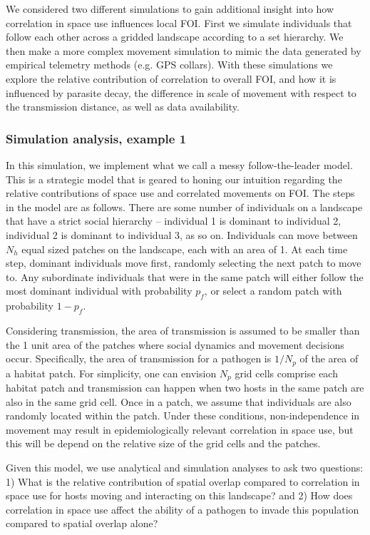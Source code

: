 \documentclass[letterpaper]{article}
\begin{document}
We considered two different simulations to gain additional insight into how correlation in space use influences local FOI. First we simulate individuals that follow each other across a gridded landscape according to a set hierarchy. We then make a more complex movement simulation to mimic the data generated by empirical telemetry methods (e.g. GPS collars). With these simulations we explore the relative contribution of correlation to overall FOI, and how it is influenced by parasite decay, the difference in scale of movement with respect to the transmission distance, as well as data availability. 

\subsubsection*{Simulation analysis, example 1}

In this simulation, we implement what we call a messy follow-the-leader model.  This is a strategic model that is geared to honing our intuition regarding the relative contributions of space use and correlated movements on FOI. The steps in the model are as follows. There are some number of individuals on a landscape that have a strict social hierarchy -- individual 1 is dominant to individual 2, individual 2 is dominant to individual 3, as so on. Individuals can move between $N_h$ equal sized patches on the landscape, each with an area of 1. At each time step, dominant individuals move first, randomly selecting the next patch to move to. Any subordinate individuals that were in the same patch will either follow the most dominant individual with probability $p_f$, or select a random patch with probability $1 - p_f$.

Considering transmission, the area of transmission is assumed to be smaller than the 1 unit area of the patches where social dynamics and movement decisions occur. Specifically, the area of transmission for a pathogen is $1 / N_p$ of the area of a habitat patch.  For simplicity, one can envision $N_p$ grid cells comprise each habitat patch and transmission can happen when two hosts in the same patch are also in the same grid cell. Once in a patch, we assume that individuals are also randomly located within the patch. Under these conditions, non-independence in movement may result in epidemiologically relevant correlation in space use, but this will be depend on the relative size of the grid cells and the patches. 

Given this model, we use analytical and simulation analyses to ask two questions:  1) What is the relative contribution of spatial overlap compared to correlation in space use for hosts moving and interacting on this landscape? and 2) How does correlation in space use affect the ability of a pathogen to invade this population compared to spatial overlap alone? 
\end{document}
